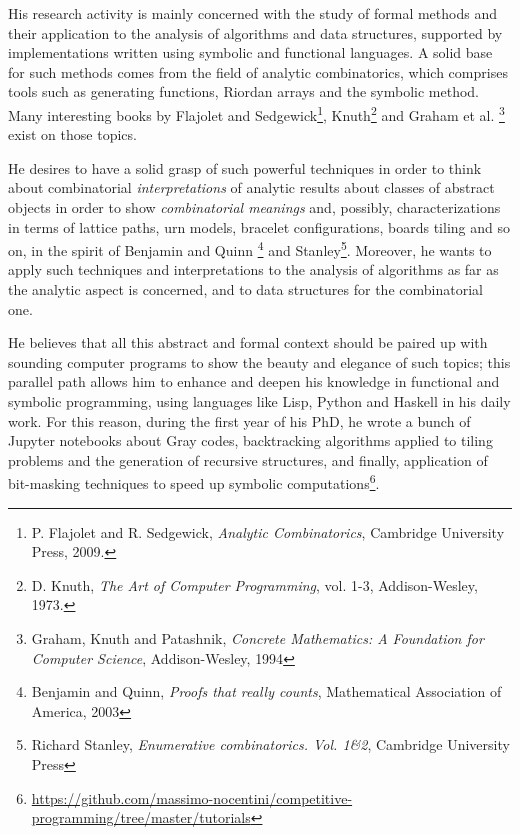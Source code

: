 \documentclass[10pt,a4paper]{scrartcl}
\begin{document}
    His research activity is mainly concerned with the study of 
    formal methods and their application to the analysis of algorithms and data structures, 
    supported by implementations written using symbolic and functional languages.
    A solid base for such methods comes from the field of analytic combinatorics, 
    which comprises tools such as generating functions, Riordan arrays and the symbolic method. Many
    interesting books by Flajolet and Sedgewick\footnote{P. Flajolet and R.
    Sedgewick, \emph{Analytic Combinatorics}, Cambridge University Press, 2009.},
    Knuth\footnote{D. Knuth, \emph{The Art of Computer Programming}, vol.  1-3,
    Addison-Wesley, 1973.} and Graham et al. \footnote{Graham, Knuth and Patashnik,
    \emph{Concrete Mathematics: A Foundation for Computer Science}, Addison-Wesley,
    1994} exist on those topics. 


    He desires to have a solid grasp of such powerful techniques in order to
    think about combinatorial \emph{interpretations} of
    analytic results about classes of abstract objects in order to show
    \emph{combinatorial meanings} and, possibly, characterizations in terms
    of lattice paths, urn models, bracelet configurations, boards
    tiling and so on, in the spirit of Benjamin and Quinn \footnote{Benjamin
    and Quinn, \emph{Proofs that really counts}, Mathematical Association of
    America, 2003} and Stanley\footnote{Richard Stanley, \emph{Enumerative
    combinatorics. {V}ol. 1\&2}, Cambridge University Press}. Moreover, he wants
    to apply such techniques and interpretations to the analysis of algorithms
    as far as the analytic aspect is concerned, and to data structures for the
    combinatorial one. 

    He believes that all this abstract and formal context should be paired up with
    sounding computer programs to show the beauty and elegance of such topics;
    this parallel path allows him to enhance and deepen his knowledge in functional
    and symbolic programming, using languages like Lisp, Python and Haskell in his daily work.
    For this reason, during the first year of his PhD, he wrote a bunch of Jupyter 
    notebooks about Gray codes, backtracking algorithms applied to tiling problems
    and the generation of recursive structures, and finally, application
    of bit-masking techniques to speed up symbolic computations\footnote{\url{https://github.com/massimo-nocentini/competitive-programming/tree/master/tutorials}}.
\end{document}
